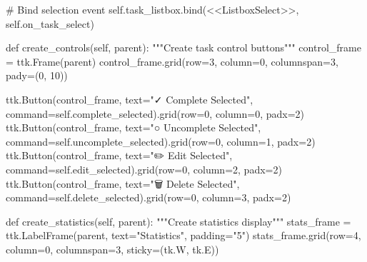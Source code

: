 \documentclass[
  letterpaper,
  DIV=11,
  numbers=noendperiod,
  oneside]{scrreprt}
\newenvironment{Shaded}{}{}
\newcommand{\CommentTok}[1]{\textcolor[rgb]{0.42,0.45,0.49}{#1}}
\newcommand{\DecValTok}[1]{\textcolor[rgb]{0.00,0.36,0.77}{#1}}
\newcommand{\KeywordTok}[1]{\textcolor[rgb]{0.84,0.23,0.29}{#1}}
\newcommand{\NormalTok}[1]{\textcolor[rgb]{0.14,0.16,0.18}{#1}}
\newcommand{\OperatorTok}[1]{\textcolor[rgb]{0.14,0.16,0.18}{#1}}
\newcommand{\StringTok}[1]{\textcolor[rgb]{0.01,0.18,0.38}{#1}}
\newcommand{\VariableTok}[1]{\textcolor[rgb]{0.89,0.38,0.04}{#1}}
\begin{document}
\begin{Shaded}
\begin{Highlighting}[]
        \CommentTok{\# Bind selection event}
        \VariableTok{self}\NormalTok{.task\_listbox.bind(}\StringTok{\textquotesingle{}\textless{}\textless{}ListboxSelect\textgreater{}\textgreater{}\textquotesingle{}}\NormalTok{, }\VariableTok{self}\NormalTok{.on\_task\_select)}
    
    \KeywordTok{def}\NormalTok{ create\_controls(}\VariableTok{self}\NormalTok{, parent):}
        \CommentTok{"""Create task control buttons"""}
\NormalTok{        control\_frame }\OperatorTok{=}\NormalTok{ ttk.Frame(parent)}
\NormalTok{        control\_frame.grid(row}\OperatorTok{=}\DecValTok{3}\NormalTok{, column}\OperatorTok{=}\DecValTok{0}\NormalTok{, columnspan}\OperatorTok{=}\DecValTok{3}\NormalTok{, pady}\OperatorTok{=}\NormalTok{(}\DecValTok{0}\NormalTok{, }\DecValTok{10}\NormalTok{))}
        
\NormalTok{        ttk.Button(control\_frame, text}\OperatorTok{=}\StringTok{"✓ Complete Selected"}\NormalTok{, }
\NormalTok{                  command}\OperatorTok{=}\VariableTok{self}\NormalTok{.complete\_selected).grid(row}\OperatorTok{=}\DecValTok{0}\NormalTok{, column}\OperatorTok{=}\DecValTok{0}\NormalTok{, padx}\OperatorTok{=}\DecValTok{2}\NormalTok{)}
\NormalTok{        ttk.Button(control\_frame, text}\OperatorTok{=}\StringTok{"○ Uncomplete Selected"}\NormalTok{, }
\NormalTok{                  command}\OperatorTok{=}\VariableTok{self}\NormalTok{.uncomplete\_selected).grid(row}\OperatorTok{=}\DecValTok{0}\NormalTok{, column}\OperatorTok{=}\DecValTok{1}\NormalTok{, padx}\OperatorTok{=}\DecValTok{2}\NormalTok{)}
\NormalTok{        ttk.Button(control\_frame, text}\OperatorTok{=}\StringTok{"✏️ Edit Selected"}\NormalTok{, }
\NormalTok{                  command}\OperatorTok{=}\VariableTok{self}\NormalTok{.edit\_selected).grid(row}\OperatorTok{=}\DecValTok{0}\NormalTok{, column}\OperatorTok{=}\DecValTok{2}\NormalTok{, padx}\OperatorTok{=}\DecValTok{2}\NormalTok{)}
\NormalTok{        ttk.Button(control\_frame, text}\OperatorTok{=}\StringTok{"🗑️ Delete Selected"}\NormalTok{, }
\NormalTok{                  command}\OperatorTok{=}\VariableTok{self}\NormalTok{.delete\_selected).grid(row}\OperatorTok{=}\DecValTok{0}\NormalTok{, column}\OperatorTok{=}\DecValTok{3}\NormalTok{, padx}\OperatorTok{=}\DecValTok{2}\NormalTok{)}
    
    \KeywordTok{def}\NormalTok{ create\_statistics(}\VariableTok{self}\NormalTok{, parent):}
        \CommentTok{"""Create statistics display"""}
\NormalTok{        stats\_frame }\OperatorTok{=}\NormalTok{ ttk.LabelFrame(parent, text}\OperatorTok{=}\StringTok{"Statistics"}\NormalTok{, padding}\OperatorTok{=}\StringTok{"5"}\NormalTok{)}
\NormalTok{        stats\_frame.grid(row}\OperatorTok{=}\DecValTok{4}\NormalTok{, column}\OperatorTok{=}\DecValTok{0}\NormalTok{, columnspan}\OperatorTok{=}\DecValTok{3}\NormalTok{, sticky}\OperatorTok{=}\NormalTok{(tk.W, tk.E))}
        

\end{Highlighting}
\end{Shaded}
\end{document}
